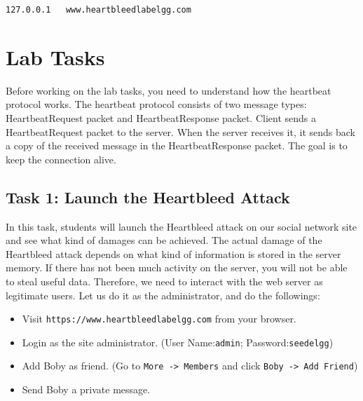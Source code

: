 \begin{lstlisting}
127.0.0.1	www.heartbleedlabelgg.com
\end{lstlisting}
 
 


\section{Lab Tasks}


Before working on the lab tasks, you need to understand how the heartbeat
protocol works.
The heartbeat protocol consists of two message types:
HeartbeatRequest packet and HeartbeatResponse packet. Client sends a
HeartbeatRequest packet to the server. When the server receives it, it 
sends back a copy of the received message in the HeartbeatResponse packet.
The goal is to keep the connection alive. 



\subsection{Task 1: Launch the Heartbleed Attack}

In this task, students will launch the Heartbleed attack on 
our social network site and see what kind of damages can be achieved. 
The actual damage of the Heartbleed attack depends on what kind of
information is stored in the server memory. If there has not been much
activity on the server, you will not be able to steal useful data.
Therefore, we need to interact with the web server as legitimate users. Let us
do it as the administrator, and do the followings:
	  
  \begin{itemize} 
  \item Visit \texttt{https://www.heartbleedlabelgg.com} from your
        browser. 
  \item Login as the site administrator. (User Name:\texttt{admin}; Password:\texttt{seedelgg})
  \item Add Boby as friend. (Go to \texttt{More -> Members} and
	  click  \texttt{Boby -> Add Friend})
  \item Send Boby a private message.
  \end{itemize} 
	    

